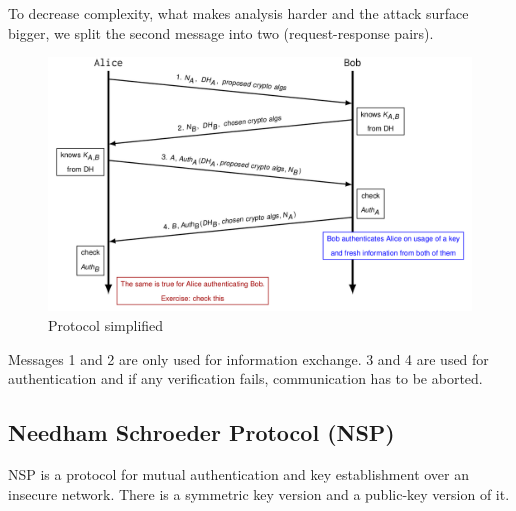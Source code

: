 To decrease complexity, what makes analysis harder and the attack surface bigger, we split the second message into two (request-response pairs).
\begin{figure}[H]
  \centering
  \includegraphics[width=\textwidth]{figures/ooppt7.png}
  \caption{Protocol simplified}\label{fig:ooppt7}
\end{figure}
Messages 1 and 2 are only used for information exchange.
3 and 4 are used for authentication and if any verification fails, communication has to be aborted.

\subsection{Needham Schroeder Protocol (NSP)}
NSP is a protocol for mutual authentication and key establishment over an insecure network.
There is a symmetric key version and a public-key version of it.

